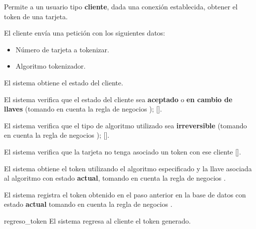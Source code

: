 %
%

{
  Permite a un usuario tipo \textbf{cliente}, dada una conexión establecida,
  obtener el token de una tarjeta.

  \begin{trayectoriaPrincipal}

    \item El cliente envía una petición con los siguientes datos:
      \begin{itemize}
        \item Número de tarjeta a tokenizar.
        \item Algoritmo tokenizador.
      \end{itemize}

    \item El sistema obtiene el estado del cliente.

    \item El sistema verifica que el estado del cliente sea \textbf{aceptado} o
      \textbf{en cambio de llaves} (tomando en cuenta la regla de negocios
      );
      [].

    \item El sistema verifica que el tipo de algoritmo utilizado sea
      \textbf{irreversible} (tomando en cuenta la regla de negocios
      );
      [].

    \item El sistema verifica que la tarjeta no tenga asociado un token con ese
      cliente [].

    \item El sistema obtiene el token utilizando el algoritmo especificado y la
      llave asociada al algoritmo con estado \textbf{actual}, tomando en cuenta
      la regla de negocios .

    \item El sistema registra el token obtenido en el paso anterior en la base
      de datos con estado \textbf{actual} tomando en cuenta la regla de negocios
      .

    \item [regreso_token] El sistema regresa al cliente el token generado.


\end{trayectoriaPrincipal}}
